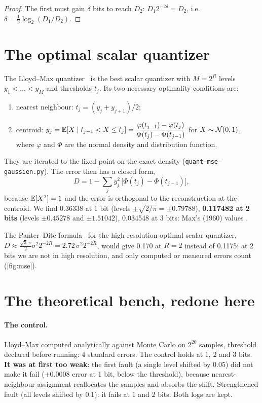 \begin{proof}
The first must gain $\delta$ bits to reach $D_2$: $D_1 2^{-2\delta} = D_2$, i.e.\ $\delta = \tfrac12 \log_2(D_1/D_2)$.
\end{proof}

\section{The optimal scalar quantizer}\label{sec:lloyd}

The Lloyd--Max quantizer~\cite{lloyd1982,max1960} is the best scalar quantizer with $M = 2^R$ levels $y_1 < \dots < y_M$ and thresholds $t_j$. Its two necessary optimality conditions are:
\begin{enumerate}
\item nearest neighbour: $t_j = (y_j + y_{j+1})/2$;
\item centroid: $y_j = \mathbb{E}[X \mid t_{j-1} < X \le t_j] = \dfrac{\varphi(t_{j-1}) - \varphi(t_j)}{\Phi(t_j) - \Phi(t_{j-1})}$ for $X \sim \mathcal{N}(0,1)$, where $\varphi$ and $\Phi$ are the normal density and distribution function.
\end{enumerate}
They are iterated to the fixed point on the exact density (\texttt{quant-mse-gaussien.py}). The error then has a closed form,
\begin{equation}\label{eq:lloyd-mse}
D = 1 - \sum_j y_j^2 \,\bigl[\Phi(t_j) - \Phi(t_{j-1})\bigr],
\end{equation}
because $\mathbb{E}[X^2] = 1$ and the error is orthogonal to the reconstruction at the centroid. We find 0.36338 at 1 bit (levels $\pm\sqrt{2/\pi} = \pm 0.79788$), \textbf{0.117482 at 2 bits} (levels $\pm 0.45278$ and $\pm 1.51042$), 0.034548 at 3 bits: Max's (1960) values \calc.

\begin{remarque}
The Panter--Dite formula~\cite{panter1951} for the high-resolution optimal scalar quantizer, $D \approx \tfrac{\sqrt3\,\pi}{2}\sigma^2 2^{-2R} = 2.72\,\sigma^2 2^{-2R}$, would give 0.170 at $R=2$ instead of 0.1175: at 2 bits we are not in high resolution, and only computed or measured errors count (\cref{fig:mse}).
\end{remarque}

\section{The theoretical bench, redone here}\label{sec:banc-mse}

\paragraph{The control.} Lloyd--Max computed analytically against Monte Carlo on $2^{20}$ samples, threshold declared before running: 4 standard errors. The control holds at 1, 2 and 3 bits. \textbf{It was at first too weak}: the first fault (a single level shifted by 0.05) did not make it fail (+0.0008 error at 1 bit, below the threshold), because nearest-neighbour assignment reallocates the samples and absorbs the shift. Strengthened fault (all levels shifted by 0.1): it fails at 1 and 2 bits. Both logs are kept.

